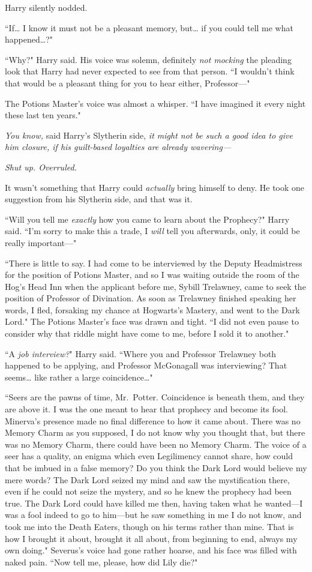 Harry silently nodded.

``If{\ldots} I know it must not be a pleasant memory, but{\ldots} if you could tell me what happened{\ldots}?"

``Why?" Harry said. His voice was solemn, definitely \emph{not mocking} the pleading look that Harry had never expected to see from that person. ``I wouldn't think that would be a pleasant thing for you to hear either, Professor—"

The Potions Master's voice was almost a whisper. ``I have imagined it every night these last ten years."

\emph{You know,} said Harry's Slytherin side, \emph{it might not be such a good idea to give him closure, if his guilt-based loyalties are already wavering—}

\emph{Shut up. Overruled.}

It wasn't something that Harry could \emph{actually} bring himself to deny. He took one suggestion from his Slytherin side, and that was it.

``Will you tell me \emph{exactly} how you came to learn about the Prophecy?" Harry said. ``I'm sorry to make this a trade, I \emph{will} tell you afterwards, only, it could be really important—"

``There is little to say. I had come to be interviewed by the Deputy Headmistress for the position of Potions Master, and so I was waiting outside the room of the Hog's Head Inn when the applicant before me, Sybill Trelawney, came to seek the position of Professor of Divination. As soon as Trelawney finished speaking her words, I fled, forsaking my chance at Hogwarts's Mastery, and went to the Dark Lord." The Potions Master's face was drawn and tight. ``I did not even pause to consider why that riddle might have come to me, before I sold it to another."

``A \emph{job interview?}" Harry said. ``Where you and Professor Trelawney both happened to be applying, and Professor McGonagall was interviewing? That seems{\ldots} like rather a large coincidence{\ldots}"

``Seers are the pawns of time, Mr.~Potter. Coincidence is beneath them, and they are above it. I was the one meant to hear that prophecy and become its fool. Minerva's presence made no final difference to how it came about. There was no Memory Charm as you supposed, I do not know why you thought that, but there was no Memory Charm, there could have been no Memory Charm. The voice of a seer has a quality, an enigma which even Legilimency cannot share, how could that be imbued in a false memory? Do you think the Dark Lord would believe my mere words? The Dark Lord seized my mind and saw the mystification there, even if he could not seize the mystery, and so he knew the prophecy had been true. The Dark Lord could have killed me then, having taken what he wanted—I was a fool indeed to go to him—but he saw something in me I do not know, and took me into the Death Eaters, though on his terms rather than mine. That is how I brought it about, brought it all about, from beginning to end, always my own doing." Severus's voice had gone rather hoarse, and his face was filled with naked pain. ``Now tell me, please, how did Lily die?"

